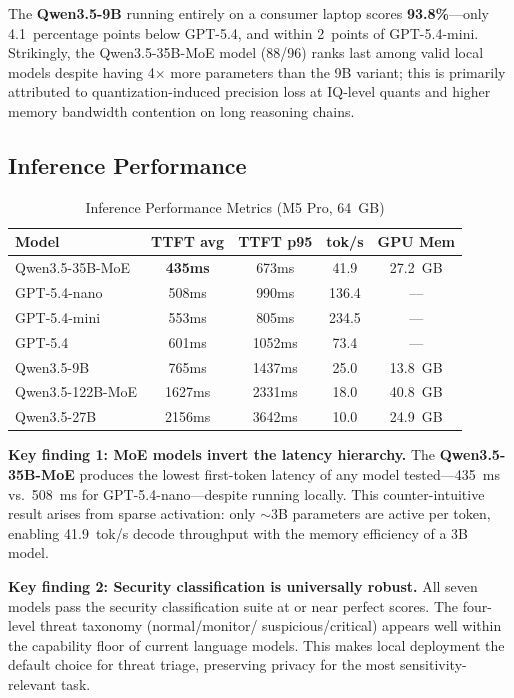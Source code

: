 \documentclass[onecolumn,10pt]{IEEEtran}
\begin{document}
The \textbf{Qwen3.5-9B} running entirely on a consumer laptop scores
\textbf{93.8\%}---only 4.1~percentage points below GPT-5.4, and within
2~points of GPT-5.4-mini. Strikingly, the Qwen3.5-35B-MoE model
(88/96) ranks last among valid local models despite having 4$\times$
more parameters than the 9B variant; this is primarily attributed to
quantization-induced precision loss at IQ-level quants and higher
memory bandwidth contention on long reasoning chains.

\subsection{Inference Performance}

\begin{table}[h]
\centering
\caption{Inference Performance Metrics (M5 Pro, 64~GB)}
\label{tab:perf}
\small
\begin{tabular}{p{2.5cm}cccc}
\toprule
\textbf{Model} & \textbf{TTFT avg} & \textbf{TTFT p95} & \textbf{tok/s} & \textbf{GPU Mem} \\
\midrule
Qwen3.5-35B-MoE & \textbf{435ms} & 673ms & 41.9 & 27.2~GB \\
GPT-5.4-nano & 508ms & 990ms & 136.4 & --- \\
GPT-5.4-mini & 553ms & 805ms & 234.5 & --- \\
GPT-5.4 & 601ms & 1052ms & 73.4 & --- \\
Qwen3.5-9B & 765ms & 1437ms & 25.0 & 13.8~GB \\
Qwen3.5-122B-MoE & 1627ms & 2331ms & 18.0 & 40.8~GB \\
Qwen3.5-27B & 2156ms & 3642ms & 10.0 & 24.9~GB \\
\bottomrule
\end{tabular}
\end{table}

\textbf{Key finding 1: MoE models invert the latency hierarchy.}
The \textbf{Qwen3.5-35B-MoE} produces the lowest first-token latency
of any model tested---435~ms vs.\ 508~ms for GPT-5.4-nano---despite
running locally. This counter-intuitive result arises from sparse
activation: only $\sim$3B parameters are active per token, enabling
41.9~tok/s decode throughput with the memory efficiency of a 3B model.

\textbf{Key finding 2: Security classification is universally robust.}
All seven models pass the security classification suite at or near
perfect scores. The four-level threat taxonomy (normal/monitor/
suspicious/critical) appears well within the capability floor of
current language models. This makes local deployment the default
choice for threat triage, preserving privacy for the most
sensitivity-relevant task.
\end{document}
